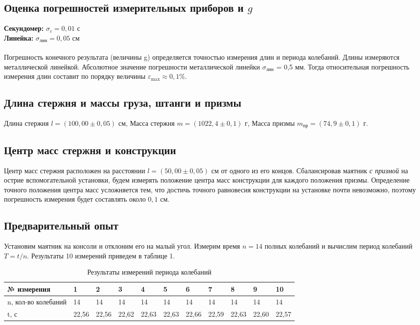 \documentclass[a5paper, 11pt]{article}
\begin{document}
\subsection{Оценка погрешностей измерительных приборов и $g$}
\textbf{Секундомер:} $ \sigma_c = 0,01 \text{ с}$\\
\textbf{Линейка:} $ \sigma_\text{лин} = 0,05 \text{ см}$\\\\

Погрешность конечного результата (величины g) определяется точностью измерения длин и периода колебаний. Длины измеряются металлической линейкой. Абсолютное значение погрешности металлической линейки $\sigma_{\text{лин}}$ = 0,5 мм. Тогда относительная погрешность измерения длин составит по порядку величины $\varepsilon_\text{max}\approx0,1\%$.

\subsection{Длина стержня и массы груза, штанги и призмы}

Длина стержня $l = \left(  100,00 \pm 0,05\right)$ см, 
Масса стержня $m =\left(  1022,4 \pm 0,1\right)$ г, 
Масса призмы $m_\text{пр}=\left( 74,9 \pm 0,1\right)$ г. 

\subsection{Центр масс стержня и конструкции}
Центр масс стержня расположен на расстоянии $l = (50, 00 \pm 0,05) \text{ см}$ от одного из его концов.  
Сбалансировав маятник \emph{с призмой} на острие вспомогательной установки, будем измерять положение центра масс конструкции для каждого положения призмы. Определение точного положения центра масс усложняется тем, что достичь точного равновесия конструкции на установке почти невозможно, поэтому погрешность измерения будет составлять около $0,1\text{ см}$.

\subsection{Предварительный опыт}
Установим маятник на консоли и отклоним его на малый угол. Измерим время $n = 14$ полных колебаний и вычислим период колебаний $T = t/n$. Результаты 10 измерений приведем в таблице 1.
\begin{table}[!ht]
	\centering
	\begin{tabular}{|l|l|l|l|l|l|l|l|l|l|l|}
		\hline
		№ измерения  & 1 & 2 & 3 & 4 & 5 & 6 & 7 & 8 & 9 & 10  \\ \hline
		n, кол-во колебаний  & 14 & 14 & 14 & 14 & 14 & 14 & 14 & 14 & 14 & 14  \\ \hline
		t, с  & 22,56 & 22,56 & 22,62 & 22,63 & 22,63 & 22,66 & 22,59 & 22,63 & 22,60 & 22,57  \\ \hline
	\end{tabular}
	\caption{Результаты измерений периода колебаний}
\end{table}
\end{document}
